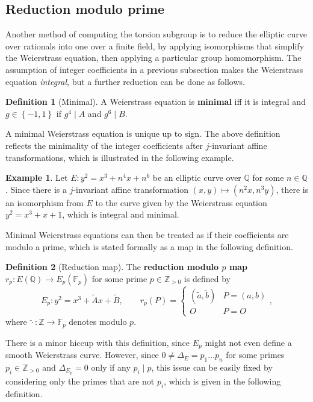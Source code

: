 \documentclass{article}
\newcommand{\F}{\mathbb{F}}
\newcommand{\Z}{\mathbb{Z}}
\newcommand{\Q}{\mathbb{Q}}
\newcommand{\rb}[1]{\left( #1 \right)}
\newcommand{\cb}[1]{\left\{ #1 \right\}}
\theoremstyle{definition}\newtheorem*{definition}{Definition}
\theoremstyle{definition}\newtheorem*{example}{Example}
\theoremstyle{definition}\newtheorem*{remark}{Remark}
\begin{document}
\pagebreak

\subsection{Reduction modulo prime}

Another method of computing the torsion subgroup is to reduce the elliptic curve over rationals into one over a finite field, by applying isomorphisms that simplify the Weierstrass equation, then applying a particular group homomorphism. The assumption of integer coefficients in a previous subsection makes the Weierstrass equation \emph{integral}, but a further reduction can be done as follows.

\begin{definition}[Minimal]
A Weierstrass equation is \textbf{minimal} iff it is integral and $ g \in \cb{-1, 1} $ if $ g^4 \mid A $ and $ g^6 \mid B $.
\end{definition}

A minimal Weierstrass equation is unique up to sign. The above definition reflects the minimality of the integer coefficients after $ j $-invariant affine transformations, which is illustrated in the following example.

\begin{example}
Let $ E : y^2 = x^3 + n^4x + n^6 $ be an elliptic curve over $ \Q $ for some $ n \in \Q $. Since there is a $ j $-invariant affine transformation $ \rb{x, y} \mapsto \rb{n^2x, n^3y} $, there is an isomorphism from $ E $ to the curve given by the Weierstrass equation $ y^2 = x^3 + x + 1 $, which is integral and minimal.
\end{example}

Minimal Weierstrass equations can then be treated as if their coefficients are modulo a prime, which is stated formally as a map in the following definition.

\begin{definition}[Reduction map]
The \textbf{reduction modulo $ p $ map} $ r_p : E\rb{\Q} \to E_p\rb{\F_p} $ for some prime $ p \in \Z_{> 0} $ is defined by
$$ E_p : y^2 = x^3 + \tilde{A}x + \tilde{B}, \qquad r_p\rb{P} = \begin{cases} \rb{\tilde{a}, \tilde{b}} & P = \rb{a, b} \\ O & P = O \end{cases}, $$
where $ \tilde{\cdot} : \Z \to \F_p $ denotes modulo $ p $.
\end{definition}

There is a minor hiccup with this definition, since $ E_p $ might not even define a smooth Weierstrass curve. However, since $ 0 \ne \Delta_E = p_1 \dots p_n $ for some primes $ p_i \in \Z_{> 0} $ and $ \Delta_{E_p} = 0 $ only if any $ p_i \mid p $, this issue can be easily fixed by considering only the primes that are not $ p_i $, which is given in the following definition.
\end{document}
